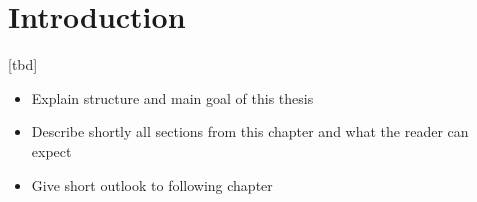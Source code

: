 \chapter{Introduction}

[tbd]

\begin{itemize}
	\item Explain structure and main goal of this thesis
	\item Describe shortly all sections from this chapter and what the reader can expect
	\item Give short outlook to following chapter
\end{itemize}












